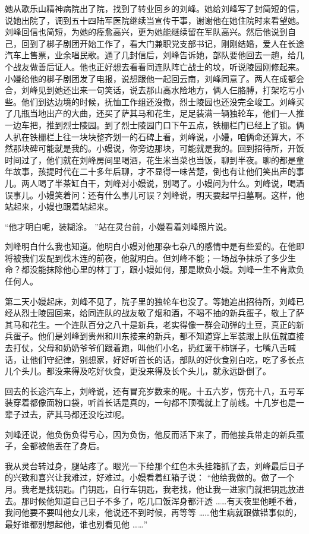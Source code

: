 \documentclass[12pt,twoside,openany]{book}
\begin{document}
她从歌乐山精神病院出了院，找到了转业回乡的刘峰。她给刘峰写了封简短的信，说她出院了，调到五十四陆军医院继续当宣传干事，谢谢他在她住院时来看望她。刘峰回信也简短，为她的痊愈高兴，更为她能继续留在军队高兴。然后他说到自己，回到了梆子剧团开始工作了，看大门兼职党支部书记，刚刚结婚，爱人在长途汽车上售票，业余唱民歌。通了几封信后，刘峰告诉她，部队要他回去一趟，给几个战友做善后证人。他也正好想去看看同连队阵亡战士的坟，听说陵园刚修起来。小嫚给他的梆子剧团发了电报，说想跟他一起回云南，刘峰同意了。两人在成都会合，刘峰见到她还出来一句笑话，说去那山高水险地方，俩人仨胳膊，打架吃亏小些。他们到达边境的时候，抚恤工作组还没撤，烈士陵园也还没完全竣工。刘峰买了几瓶当地出产的大曲，还买了萨其马和花生，足足装满一辆独轮车，他们一人推一边车把，推到烈士陵园。到了烈士陵园门口下午五点，铁栅栏门已经上了锁。俩人扒在铁栅栏上往一块块整齐划一的石碑上看，刘峰说，小嫚，咱俩命还算大，不然那块碑可能就是我的。小嫚说，你旁边那块，可能就是我的。回到招待所，开饭时间过了，他们就在刘峰房间里喝酒，花生米当菜也当饭，聊到半夜。聊的都是童年故事，孩提时代在二十多年后聊，才不显得一味苦楚，倒也有让他们笑出声的事儿。两人喝了半茶缸白干，刘峰对小嫚说，别喝了。小嫚问为什么。刘峰说，喝酒误事儿。小嫚笑着问：还有什么事儿可误？刘峰说，明天要起早扫墓啊。这样，他站起来，小嫚也跟着站起来。

“他才明白呢，装糊涂。 ”站在灵台前，小嫚看着刘峰照片说。

刘峰明白什么我也知道。他明白小嫚对他那杂七杂八的感情中是有些爱的。在他即将被我们发配到伐木连的前夜，他就明白。但刘峰不能；一场战争抹杀了多少生命？都没能抹除他心里的林丁丁，跟小嫚如何，那是欺负小嫚。刘峰一生不肯欺负任何人。

第二天小嫚起床，刘峰不见了，院子里的独轮车也没了。等她追出招待所，刘峰已经从烈士陵园回来，给同连队的战友敬了烟和酒，不喝不抽的新兵蛋子，敬上了萨其马和花生。一个连队百分之八十是新兵，老实得像一群会动弹的土豆，真正的新兵蛋子。他们是刘峰到贵州和川东接来的新兵，都不知道穿上军装跟上队伍就直接去打仗，父母和奶奶爷爷们跟着跑，叫他们小名，扔红薯干柿饼子，七嘴八舌喊话，让他们守纪律，别想家，好好听首长的话，部队的好伙食别白吃，吃了多长点儿个头儿。都没来得及吃好伙食，更没来得及长个头儿，就永远卧倒了。

回去的长途汽车上，刘峰说，还有冒充岁数来的呢。十五六岁，愣充十八，五号军装穿着都像面粉口袋，听首长话是真的，一句都不顶嘴就上了前线。十几岁也是一辈子过去，萨其马都还没吃过呢。

刘峰还说，他负伤负得亏心，因为负伤，他反而活下来了，而他接兵带走的新兵蛋子，全都被他丢在了身后。

我从灵台转过身，腿站疼了。眼光一下给那个红色木头挂箱抓了去，刘峰最后日子的兴致和喜兴让我难过，好难过。小嫚看着红箱子说： “他给我做的。做了一个月。我老是找钥匙。门钥匙，自行车钥匙，我老找，他让我一进家门就把钥匙放进去。那时候他知道自己日子不多了，吃几口饭浑身都汗透 ……有天夜里他睡不着，我问他要不要叫他女儿来，他说还不到时候，再等等 ……他生病就跟做错事似的，最好谁都别想起他，谁也别看见他 ……”
\end{document}
